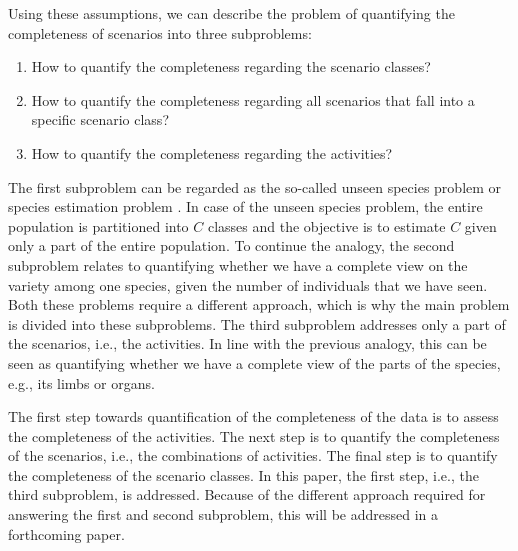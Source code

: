 Using these assumptions, we can describe the problem of quantifying the completeness of scenarios into three subproblems:
\begin{enumerate}
	\item How to quantify the completeness regarding the scenario classes?
	\item How to quantify the completeness regarding all scenarios that fall into a specific scenario class?
	\item How to quantify the completeness regarding the activities?
\end{enumerate}

The first subproblem can be regarded as the so-called unseen species problem \cite{bunge1993estimating, gandolfi2004nonparametric} or species estimation problem \cite{yang2012estimating}. In case of the unseen species problem, the entire population is partitioned into $C$ classes and the objective is to estimate $C$ given only a part of the entire population. To continue the analogy, the second subproblem relates to quantifying whether we have a complete view on the variety among one species, given the number of individuals that we have seen. Both these problems require a different approach, which is why the main problem is divided into these subproblems. The third subproblem addresses only a part of the scenarios, i.e., the activities. In line with the previous analogy, this can be seen as quantifying whether we have a complete view of the parts of the species, e.g., its limbs or organs.

The first step towards quantification of the completeness of the data is to assess the completeness of the activities. The next step is to quantify the completeness of the scenarios, i.e., the combinations of activities. The final step is to quantify the completeness of the scenario classes. In this paper,  the first step, i.e., the third subproblem, is addressed. Because of the different approach required for answering the first and second subproblem, this will be addressed in a forthcoming paper.
